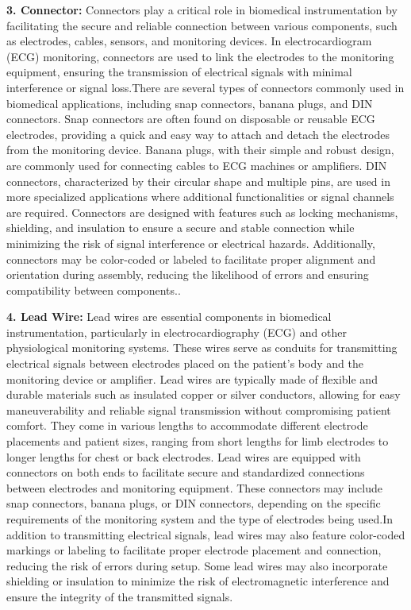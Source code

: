 \textbf{3. Connector:}
   Connectors play a critical role in biomedical instrumentation by facilitating the secure and reliable connection between various components, such as electrodes, cables, sensors, and monitoring devices. In electrocardiogram (ECG) monitoring, connectors are used to link the electrodes to the monitoring equipment, ensuring the transmission of electrical signals with minimal interference or signal loss.There are several types of connectors commonly used in biomedical applications, including snap connectors, banana plugs, and DIN connectors. Snap connectors are often found on disposable or reusable ECG electrodes, providing a quick and easy way to attach and detach the electrodes from the monitoring device. Banana plugs, with their simple and robust design, are commonly used for connecting cables to ECG machines or amplifiers. DIN connectors, characterized by their circular shape and multiple pins, are used in more specialized applications where additional functionalities or signal channels are required.
   Connectors are designed with features such as locking mechanisms, shielding, and insulation to ensure a secure and stable connection while minimizing the risk of signal interference or electrical hazards. Additionally, connectors may be color-coded or labeled to facilitate proper alignment and orientation during assembly, reducing the likelihood of errors and ensuring compatibility between components..

\textbf{4. Lead Wire:}
      Lead wires are essential components in biomedical instrumentation, particularly in electrocardiography (ECG) and other physiological monitoring systems. These wires serve as conduits for transmitting electrical signals between electrodes placed on the patient's body and the monitoring device or amplifier.
      Lead wires are typically made of flexible and durable materials such as insulated copper or silver conductors, allowing for easy maneuverability and reliable signal transmission without compromising patient comfort. They come in various lengths to accommodate different electrode placements and patient sizes, ranging from short lengths for limb electrodes to longer lengths for chest or back electrodes. Lead wires are equipped with connectors on both ends to facilitate secure and standardized connections between electrodes and monitoring equipment. These connectors may include snap connectors, banana plugs, or DIN connectors\cite{libman2023ecg}, depending on the specific requirements of the monitoring system and the type of electrodes being used.In addition to transmitting electrical signals, lead wires may also feature color-coded markings or labeling to facilitate proper electrode placement and connection, reducing the risk of errors during setup. Some lead wires may also incorporate shielding or insulation to minimize the risk of electromagnetic interference and ensure the integrity of the transmitted signals.

